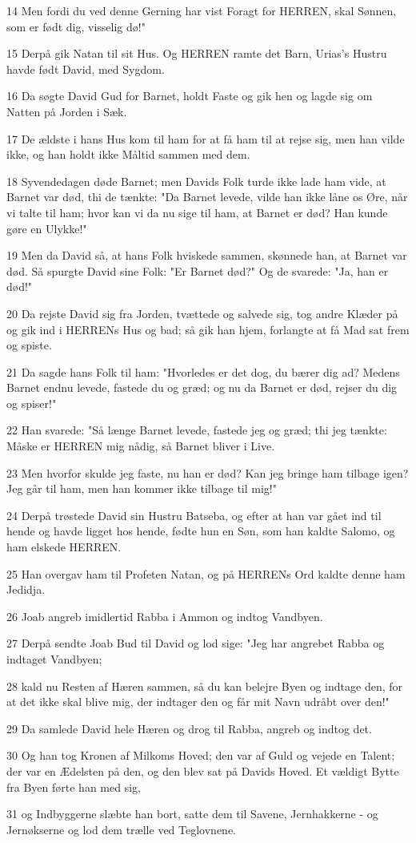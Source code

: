 \par 14 Men fordi du ved denne Gerning har vist Foragt for HERREN, skal Sønnen, som er født dig, visselig dø!"
\par 15 Derpå gik Natan til sit Hus. Og HERREN ramte det Barn, Urias's Hustru havde født David, med Sygdom.
\par 16 Da søgte David Gud for Barnet, holdt Faste og gik hen og lagde sig om Natten på Jorden i Sæk.
\par 17 De ældste i hans Hus kom til ham for at få ham til at rejse sig, men han vilde ikke, og han holdt ikke Måltid sammen med dem.
\par 18 Syvendedagen døde Barnet; men Davids Folk turde ikke lade ham vide, at Barnet var død, thi de tænkte: "Da Barnet levede, vilde han ikke låne os Øre, når vi talte til ham; hvor kan vi da nu sige til ham, at Barnet er død? Han kunde gøre en Ulykke!"
\par 19 Men da David så, at hans Folk hviskede sammen, skønnede han, at Barnet var død. Så spurgte David sine Folk: "Er Barnet død?" Og de svarede: "Ja, han er død!"
\par 20 Da rejste David sig fra Jorden, tvættede og salvede sig, tog andre Klæder på og gik ind i HERRENs Hus og bad; så gik han hjem, forlangte at få Mad sat frem og spiste.
\par 21 Da sagde hans Folk til ham: "Hvorledes er det dog, du bærer dig ad? Medens Barnet endnu levede, fastede du og græd; og nu da Barnet er død, rejser du dig og spiser!"
\par 22 Han svarede: "Så længe Barnet levede, fastede jeg og græd; thi jeg tænkte: Måske er HERREN mig nådig, så Barnet bliver i Live.
\par 23 Men hvorfor skulde jeg faste, nu han er død? Kan jeg bringe ham tilbage igen? Jeg går til ham, men han kommer ikke tilbage til mig!"
\par 24 Derpå trøstede David sin Hustru Batseba, og efter at han var gået ind til hende og havde ligget hos hende, fødte hun en Søn, som han kaldte Salomo, og ham elskede HERREN.
\par 25 Han overgav ham til Profeten Natan, og på HERRENs Ord kaldte denne ham Jedidja.
\par 26 Joab angreb imidlertid Rabba i Ammon og indtog Vandbyen.
\par 27 Derpå sendte Joab Bud til David og lod sige: "Jeg har angrebet Rabba og indtaget Vandbyen;
\par 28 kald nu Resten af Hæren sammen, så du kan belejre Byen og indtage den, for at det ikke skal blive mig, der indtager den og får mit Navn udråbt over den!"
\par 29 Da samlede David hele Hæren og drog til Rabba, angreb og indtog det.
\par 30 Og han tog Kronen af Milkoms Hoved; den var af Guld og vejede en Talent; der var en Ædelsten på den, og den blev sat på Davids Hoved. Et vældigt Bytte fra Byen førte han med sig,
\par 31 og Indbyggerne slæbte han bort, satte dem til Savene, Jernhakkerne - og Jernøkserne og lod dem trælle ved Teglovnene.

